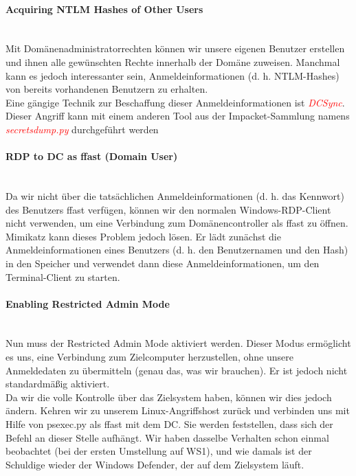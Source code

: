 \paragraph{Acquiring NTLM Hashes of Other Users}\mbox{} \\
Mit Domänenadministratorrechten können wir unsere eigenen Benutzer erstellen und ihnen alle gewünschten Rechte innerhalb der Domäne zuweisen. Manchmal kann es jedoch interessanter sein, Anmeldeinformationen (d. h. NTLM-Hashes) von bereits vorhandenen Benutzern zu erhalten.\\

Eine gängige Technik zur Beschaffung dieser Anmeldeinformationen ist \textcolor{red}{\textit{DCSync}}.\\
Dieser Angriff kann mit einem anderen Tool aus der Impacket-Sammlung namens \textcolor{red}{\textit{secretsdump.py}} durchgeführt werden

\paragraph{RDP to DC as ffast (Domain User)}\mbox{} \\
Da wir nicht über die tatsächlichen Anmeldeinformationen (d. h. das Kennwort) des Benutzers ffast verfügen, können wir den normalen Windows-RDP-Client nicht verwenden, um eine Verbindung zum Domänencontroller als ffast zu öffnen.\\

Mimikatz kann dieses Problem jedoch lösen. Er lädt zunächst die Anmeldeinformationen eines Benutzers (d. h. den Benutzernamen und den Hash) in den Speicher und verwendet dann diese Anmeldeinformationen, um den Terminal-Client zu starten.

\paragraph{Enabling Restricted Admin Mode}\mbox{} \\
Nun muss der Restricted Admin Mode aktiviert werden. Dieser Modus ermöglicht es uns, eine Verbindung zum Zielcomputer herzustellen, ohne unsere Anmeldedaten zu übermitteln (genau das, was wir brauchen). Er ist jedoch nicht standardmäßig aktiviert.\\
Da wir die volle Kontrolle über das Zielsystem haben, können wir dies jedoch ändern. Kehren wir zu unserem Linux-Angriffshost zurück und verbinden uns mit Hilfe von psexec.py als ffast mit dem DC.
Sie werden feststellen, dass sich der Befehl an dieser Stelle aufhängt. Wir haben dasselbe Verhalten schon einmal beobachtet (bei der ersten Umstellung auf WS1), und wie damals ist der Schuldige wieder der Windows Defender, der auf dem Zielsystem läuft.\\

